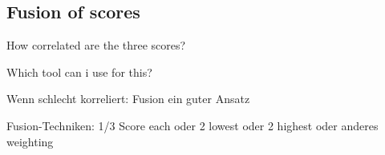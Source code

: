 \documentclass[a4paper, oneside]{csthesis}
\begin{document}
\subsection{Fusion of scores}

How correlated are the three scores?

Which tool can i use for this?

Wenn schlecht korreliert: Fusion ein guter Ansatz

Fusion-Techniken: 1/3 Score each oder 2 lowest oder 2 highest oder anderes weighting





\end{document}
